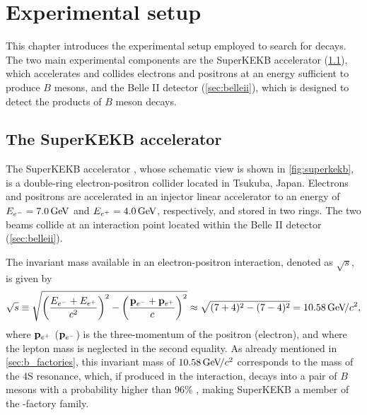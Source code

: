 \chapter{Experimental setup} \label{ch:setup}
This chapter introduces the experimental setup employed to search for \BKnn decays.
The two main experimental components are the SuperKEKB accelerator (\cref{sec:superkekb}), which accelerates and collides electrons and positrons at an energy sufficient to produce $B$ mesons, and the Belle II detector (\cref{sec:belleii}), which is designed to detect the products of $B$ meson decays.
\section{The SuperKEKB accelerator} \label{sec:superkekb}
The SuperKEKB accelerator \cite{AKAI2018188}, whose schematic view is shown in \cref{fig:superkekb}, is a double-ring electron-positron collider located in Tsukuba, Japan.
Electrons and positrons are accelerated in an injector linear accelerator to an energy of $E_{e^-}=7.0\mathrm{\,Ge\kern -0.1em V}$ and $E_{e^+}=4.0\mathrm{\,Ge\kern -0.1em V}$, respectively, and stored in two rings.
The two beams collide at an interaction point located within the Belle II detector (\cref{sec:belleii}).


The invariant mass available in an electron-positron interaction, denoted as $\sqrt{s}$, is given by
\begin{equation}
\sqrt{s}\equiv\sqrt{\left(\frac{E_{e^-}+E_{e^+}}{c^2}\right)^2-\left(\frac{\mathbf{p}_{e^-}+\mathbf{p}_{e^+}}{c}\right)^2}\approx\sqrt{(7+4)^2-(7-4)^2}=10.58{\mathrm{\,Ge\kern -0.1em V\!/}c^2},
\end{equation}
where $\mathbf{p}_{e^+}$ ($\mathbf{p}_{e^-}$) is the three-momentum of the positron (electron), and where the lepton mass is neglected in the second equality.
As already mentioned in \cref{sec:b_factories}, this invariant mass of $10.58{\mathrm{\,Ge\kern -0.1em V\!/}c^2}$ corresponds to the mass of the \Y4S resonance, which, if produced in the interaction, decays into a pair of $B$ mesons with a probability higher than 96\% \cite{ParticleDataGroup:2020ssz}, making SuperKEKB a member of the \B-factory family.

